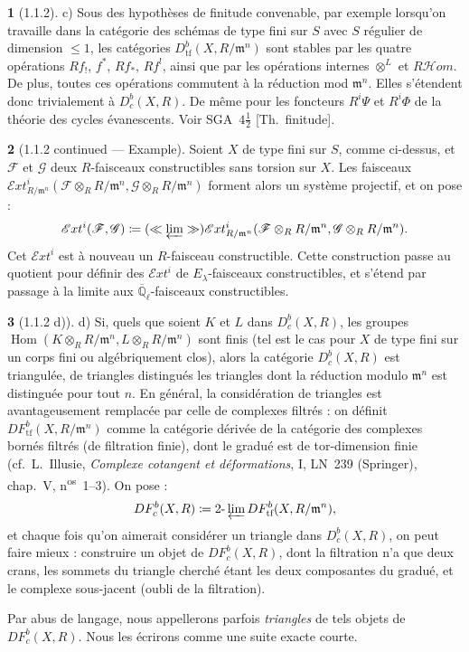\documentclass[12pt,a4paper]{article}
\theoremstyle{plain}
\theoremstyle{definition}
\theoremstyle{definition}
\newtheorem{para}{}[section]
\theoremstyle{remark}
\DeclareMathOperator{\Hom}{Hom}
\newcommand{\limproj}{\varprojlim}
\begin{document}
\begin{para}[1.1.2]
c) Sous des hypoth\`eses de finitude convenable, par exemple lorsqu'on travaille dans la cat\'egorie des sch\'emas de type fini sur $S$ avec $S$ r\'egulier de dimension $\leq 1$, les cat\'egories $D^b_{\text{tf}}(X, R/\mathfrak{m}^n)$ sont stables par les quatre op\'erations $Rf_!$, $f^*$, $Rf_*$, $Rf^!$, ainsi que par les op\'erations internes $\otimes^L$ et $R\mathscr{H}om$. De plus, toutes ces op\'erations commutent \`a la r\'eduction mod $\mathfrak{m}^n$. Elles s'\'etendent donc trivialement \`a $D^b_c(X, R)$. De m\^eme pour les foncteurs $R^i \Psi$ et $R^i \Phi$ de la th\'eorie des cycles \'evanescents. Voir SGA~$4\frac{1}{2}$ [Th.~finitude].
\end{para}

\begin{para}[1.1.2 continued --- Example]
Soient $X$ de type fini sur $S$, comme ci-dessus, et $\mathscr{F}$ et $\mathscr{G}$ deux $R$-faisceaux constructibles sans torsion sur $X$. Les faisceaux $\mathscr{E}xt^i_{R/\mathfrak{m}^n}(\mathscr{F} \otimes_R R/\mathfrak{m}^n, \mathscr{G} \otimes_R R/\mathfrak{m}^n)$ forment alors un syst\`eme projectif, et on pose :
\[\mathscr{E}xt^i(\mathscr{F}, \mathscr{G}) \coloneqq (\ll \limproj \gg) \mathscr{E}xt^i_{R/\mathfrak{m}^n}(\mathscr{F} \otimes_R R/\mathfrak{m}^n, \mathscr{G} \otimes_R R/\mathfrak{m}^n).\]
Cet $\mathscr{E}xt^i$ est \`a nouveau un $R$-faisceau constructible. Cette construction passe au quotient pour d\'efinir des $\mathscr{E}xt^i$ de $E_\lambda$-faisceaux constructibles, et s'\'etend par passage \`a la limite aux $\overline{\mathbb{Q}}_\ell$-faisceaux constructibles.
\end{para}

\begin{para}[1.1.2 d)]
d) Si, quels que soient $K$ et $L$ dans $D^b_c(X, R)$, les groupes $\Hom(K \otimes_R R/\mathfrak{m}^n, L \otimes_R R/\mathfrak{m}^n)$ sont finis (tel est le cas pour $X$ de type fini sur un corps fini ou alg\'ebriquement clos), alors la cat\'egorie $D^b_c(X, R)$ est triangul\'ee, de triangles distingu\'es les triangles dont la r\'eduction modulo $\mathfrak{m}^n$ est distingu\'ee pour tout $n$. En g\'en\'eral, la consid\'eration de triangles est avantageusement remplac\'ee par celle de complexes filtr\'es : on d\'efinit $DF^b_{\text{tf}}(X, R/\mathfrak{m}^n)$ comme la cat\'egorie d\'eriv\'ee de la cat\'egorie des complexes born\'es filtr\'es (de filtration finie), dont le gradu\'e est de tor-dimension finie (cf.~L.~Illusie, \emph{Complexe cotangent et d\'eformations}, I, LN~239 (Springer), chap.~V, n\textsuperscript{os}~1--3). On pose :
\[DF^b_c(X, R) \coloneqq 2\text{-}\limproj DF^b_{\text{tf}}(X, R/\mathfrak{m}^n),\]
et chaque fois qu'on aimerait consid\'erer un triangle dans $D^b_c(X, R)$, on peut faire mieux : construire un objet de $DF^b_c(X, R)$, dont la filtration n'a que deux crans, les sommets du triangle cherch\'e \'etant les deux composantes du gradu\'e, et le complexe sous-jacent (oubli de la filtration).

Par abus de langage, nous appellerons parfois \emph{triangles} de tels objets de $DF^b_c(X, R)$. Nous les \'ecrirons comme une suite exacte courte.
\end{para}
\end{document}
